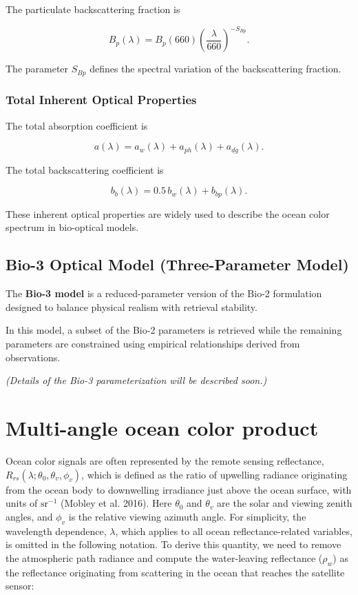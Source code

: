 \documentclass[
  letterpaper,
  open=any]{scrbook}
\begin{document}
The particulate backscattering fraction is

\[
B_p(\lambda) =
B_p(660)\left(\frac{\lambda}{660}\right)^{-S_{Bp}}.
\]

The parameter \(S_{Bp}\) defines the spectral variation of the
backscattering fraction.

\subsection{Total Inherent Optical
Properties}\label{total-inherent-optical-properties}

The total absorption coefficient is

\[
a(\lambda) =
a_w(\lambda) + a_{ph}(\lambda) + a_{dg}(\lambda).
\]

The total backscattering coefficient is

\[
b_b(\lambda) =
0.5\,b_w(\lambda) + b_{bp}(\lambda).
\]

These inherent optical properties are widely used to describe the ocean
color spectrum in bio-optical models.

\section{Bio-3 Optical Model (Three-Parameter
Model)}\label{bio-3-optical-model-three-parameter-model}

The \textbf{Bio-3 model} is a reduced-parameter version of the Bio-2
formulation designed to balance physical realism with retrieval
stability.

In this model, a subset of the Bio-2 parameters is retrieved while the
remaining parameters are constrained using empirical relationships
derived from observations.

\emph{(Details of the Bio-3 parameterization will be described soon.)}

\chapter{Multi-angle ocean color
product}\label{multi-angle-ocean-color-product}

Ocean color signals are often represented by the remote sensing
reflectance, \(R_{rs}(\lambda;\theta_0, \theta_v, \phi_v)\), which is
defined as the ratio of upwelling radiance originating from the ocean
body to downwelling irradiance just above the ocean surface, with units
of \(\mathrm{sr}^{-1}\) (Mobley et al. 2016). Here \(\theta_0\) and
\(\theta_v\) are the solar and viewing zenith angles, and \(\phi_v\) is
the relative viewing azimuth angle. For simplicity, the wavelength
dependence, \(\lambda\), which applies to all ocean reflectance-related
variables, is omitted in the following notation. To derive this
quantity, we need to remove the atmospheric path radiance and compute
the water-leaving reflectance (\(\rho_w\)) as the reflectance
originating from scattering in the ocean that reaches the satellite
sensor:
\end{document}
